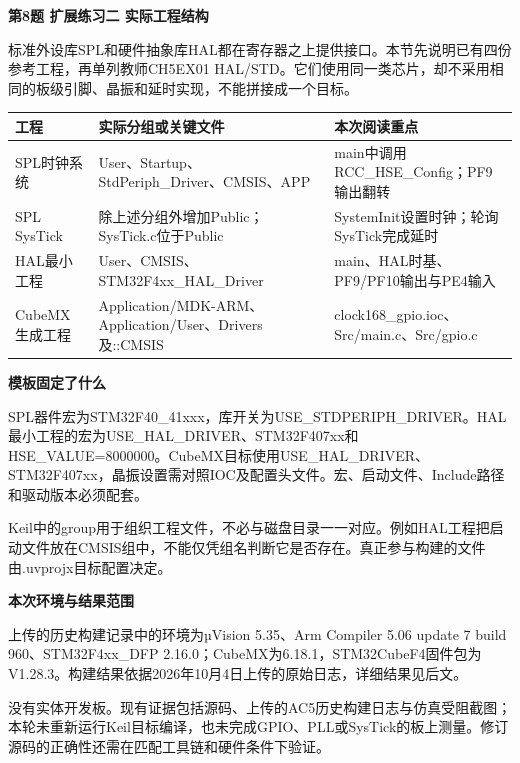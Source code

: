 \documentclass[10pt,a4paper]{article}
\newcommand{\qtitle}[1]{{\Large\bfseries #1}\par\vspace{4pt}}
\newcommand{\qsub}[1]{{\bfseries #1}\par}
\begin{document}
\clearpage
{}
\qtitle{第8题 扩展练习二 实际工程结构}
标准外设库SPL和硬件抽象库HAL都在寄存器之上提供接口。本节先说明已有四份参考工程，再单列教师CH5EX01 HAL/\allowbreak{}STD。它们使用同一类芯片，却不采用相同的板级引脚、晶振和延时实现，不能拼接成一个目标。

\begingroup\small
\begin{tabularx}{\linewidth}{|>{\hsize}Y|>{\hsize}Y|>{\hsize}Y|}\hline
{}
\textbf{工程} & \textbf{实际分组或关键文件} & \textbf{本次阅读重点} \\ \hline
SPL时钟系统 & User、Startup、StdPeriph\_\allowbreak{}Driver、CMSIS、APP & main中调用RCC\_\allowbreak{}HSE\_\allowbreak{}Config；PF9输出翻转 \\ \hline
SPL SysTick & 除上述分组外增加Public；SysTick.c位于Public & SystemInit设置时钟；轮询SysTick完成延时 \\ \hline
HAL最小工程 & User、CMSIS、STM32F4xx\_\allowbreak{}HAL\_\allowbreak{}Driver & main、HAL时基、PF9/\allowbreak{}PF10输出与PE4输入 \\ \hline
CubeMX生成工程 & Application/\allowbreak{}MDK-ARM、Application/\allowbreak{}User、Drivers及::CMSIS & clock168\_\allowbreak{}gpio.ioc、Src/\allowbreak{}main.c、Src/\allowbreak{}gpio.c \\ \hline
\end{tabularx}
\endgroup\par
\qsub{模板固定了什么}
SPL器件宏为STM32F40\_\allowbreak{}41xxx，库开关为USE\_\allowbreak{}STDPERIPH\_\allowbreak{}DRIVER。HAL最小工程的宏为USE\_\allowbreak{}HAL\_\allowbreak{}DRIVER、STM32F407xx和HSE\_\allowbreak{}VALUE=8000000。CubeMX目标使用USE\_\allowbreak{}HAL\_\allowbreak{}DRIVER、STM32F407xx，晶振设置需对照IOC及配置头文件。宏、启动文件、Include路径和驱动版本必须配套。

Keil中的group用于组织工程文件，不必与磁盘目录一一对应。例如HAL工程把启动文件放在CMSIS组中，不能仅凭组名判断它是否存在。真正参与构建的文件由.uvprojx目标配置决定。

\qsub{本次环境与结果范围}
上传的历史构建记录中的环境为µVision 5.35、Arm Compiler 5.06 update 7 build 960、STM32F4xx\_\allowbreak{}DFP 2.16.0；CubeMX为6.18.1，STM32CubeF4固件包为V1.28.3。构建结果依据2026年10月4日上传的原始日志，详细结果见后文。

没有实体开发板。现有证据包括源码、上传的AC5历史构建日志与仿真受阻截图；本轮未重新运行Keil目标编译，也未完成GPIO、PLL或SysTick的板上测量。修订源码的正确性还需在匹配工具链和硬件条件下验证。
\end{document}
